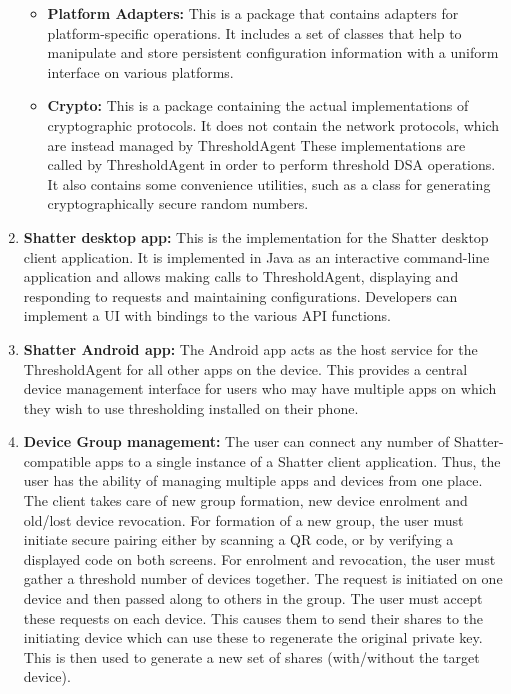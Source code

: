 \begin{enumerate}[label=\arabic*., wide, labelwidth=!, labelindent=0pt]
\begin{itemize}
		\item \textbf{Platform Adapters:} This is a package that contains adapters for platform-specific operations. It includes a set of classes that 				help to manipulate and store persistent configuration information with a uniform interface on various platforms.
		\item \textbf{Crypto:} This is a package containing the actual implementations of cryptographic protocols. It does not contain the network 				protocols, which are instead managed by ThresholdAgent These implementations are called by ThresholdAgent in order to perform threshold 				DSA 	operations. It also contains 	some convenience utilities, such as a class for generating cryptographically secure random numbers.
	\end{itemize}
	\item \textbf{Shatter desktop app:} This is the implementation for the Shatter desktop client application. It is implemented in Java as an 					interactive command-line application and allows making calls to ThresholdAgent, displaying and responding to requests and 											maintaining configurations. Developers can implement a UI with bindings to the various API functions.
	\item\textbf{Shatter Android app:} The Android app acts as the host service for the ThresholdAgent for all other apps on the device. This 					provides a central device management interface for users who may have multiple apps on which they wish to use thresholding installed on their 			phone.
	\item \textbf{Device Group management:} The user can connect any number of Shatter-compatible apps to a single instance of a Shatter client 			application. Thus, the user has the ability of managing multiple apps and devices from one place. The client takes care of new group formation, 			new device enrolment and old/lost device revocation. For formation of a new group, the user must initiate secure pairing either by scanning a QR 		code, or by verifying a displayed code on both screens. For enrolment and revocation, the user must gather a threshold number of devices 					together. The request is initiated on one device and then passed along to others in the group. The user must accept these requests on each 				device. This causes them to send their shares to the initiating device which can use these to regenerate the original private key. This is then used 		to generate a new set of shares (with/without the target device).
\end{enumerate}
	
